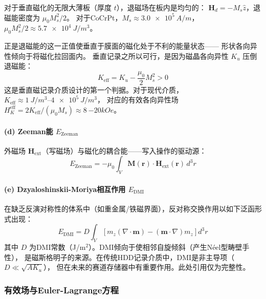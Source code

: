 \documentclass[11pt,a4paper,twoside]{article}
\theoremstyle{definition}
\theoremstyle{plain}
\theoremstyle{remark}
\begin{document}
对于垂直磁化的无限大薄板（厚度 $t$），退磁场在板内是均匀的：
$\mathbf{H}_d = -M_s \hat{z}$，退磁能密度为 $\mu_0 M_s^2/2$。
对于CoCrPt，$M_s \approx \SI{3.0e5}{A/m}$，
$\mu_0 M_s^2/2 \approx \SI{5.7e4}{J/m^3}$。

正是退磁能的这一正值使垂直于膜面的磁化处于不利的能量状态——
形状各向异性倾向于将磁化拉回面内。
垂直记录之所以可行，是因为磁晶各向异性 $K_u$ 压倒退磁能：
\begin{equation}
  K_{\text{eff}} = K_u - \frac{\mu_0}{2} M_s^2 > 0
  \label{eq:keff}
\end{equation}
这是垂直磁记录介质设计的第一个判据。对于现代介质，$K_{\text{eff}} \approx \SIrange{1}{4e5}{J/m^3}$，
对应的有效各向异性场 $H_K^{\text{eff}} = 2 K_{\text{eff}} / (\mu_0 M_s) \approx \SI{8}{-20}{kOe}$。

\paragraph{(d) Zeeman能 $E_{\text{Zeeman}}$}

外磁场 $\mathbf{H}_{\text{ext}}$（写磁场）与磁化的耦合能——写入操作的驱动源：
\begin{equation}
  E_{\text{Zeeman}} = -\mu_0 \int_V \mathbf{M}(\mathbf{r}) \cdot \mathbf{H}_{\text{ext}}(\mathbf{r}) \, d^3r
\end{equation}

\paragraph{(e) Dzyaloshinskii-Moriya相互作用 $E_{\text{DMI}}$}

在缺乏反演对称性的体系中（如重金属/铁磁界面），反对称交换作用以如下泛函形式出现：
\begin{equation}
  E_{\text{DMI}} = D \int_V \left[ m_z (\nabla \cdot \mathbf{m})
                   - (\mathbf{m} \cdot \nabla) m_z \right] d^3r
\end{equation}
其中 $D$ 为DMI常数（J/m$^2$）。DMI倾向于使相邻自旋倾斜（产生N\'{e}el型畴壁手性），
是磁斯格明子的来源。在传统HDD记录介质中，DMI是非主导项（$D \ll \sqrt{A K_u}$），
但在未来的赛道存储器中有重要作用。此处引用仅为完整性。

\subsubsection{有效场与Euler-Lagrange方程}
\end{document}
